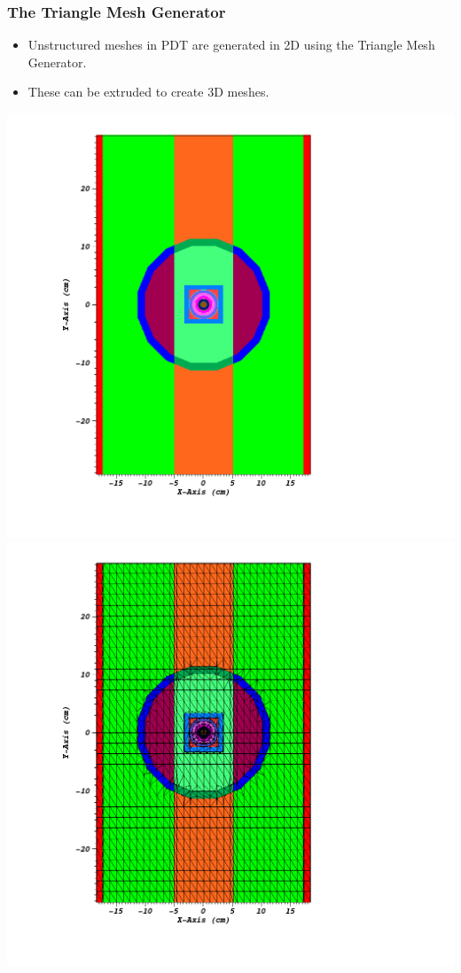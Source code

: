 \documentclass[]{beamer}
\begin{document}
\begin{frame}[t]\frametitle{The Triangle Mesh Generator}
	\begin{block}{}
	\begin{itemize}
		\item Unstructured meshes in PDT are generated in 2D using the Triangle Mesh Generator.
		\item These can be extruded to create 3D meshes.
	\end{itemize}	
	\end{block}
	\includegraphics[scale = 0.15]{figures/IM12DPoly.png}
	\includegraphics[scale = 0.15]{figures/IM12DMesh.png}
\end{frame}
\end{document}
